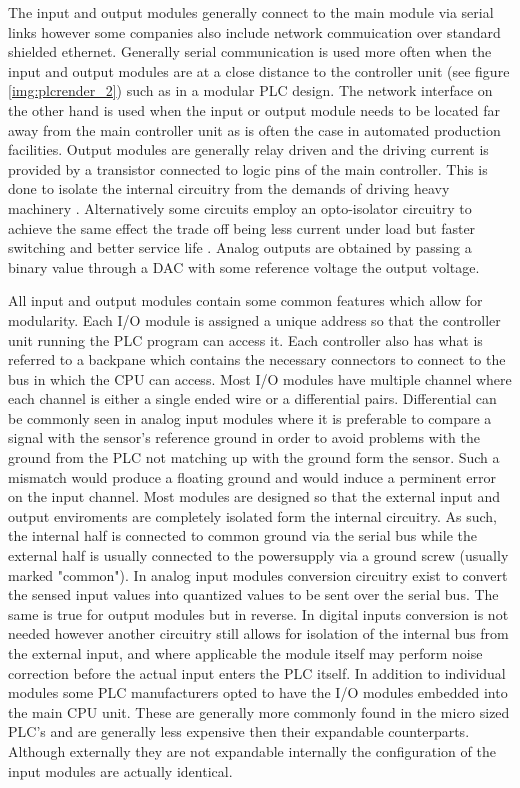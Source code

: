 The input and output modules generally connect to the main module via serial links however some companies also include network commuication over standard shielded ethernet\cite{rockwell_io,rockwell_tech_pub}. Generally serial communication is used more often when the input and output modules are at a close distance to the controller unit (see figure \ref{img:plcrender_2}) such as in a modular PLC design. The network interface on the other hand is used when the input or output module needs to be located far away from the main controller unit\cite{rockwell_tech_pub} as is often the case in automated production facilities. Output modules are generally relay driven and the driving current is provided by a transistor connected to logic pins of the main controller. This is done to isolate the internal circuitry from the demands of driving heavy machinery \cite{plcapp}. Alternatively some circuits employ an opto-isolator circuitry to achieve the same effect the trade off being less current under load but faster switching and better service life \cite{plcapp}. Analog outputs are obtained by passing a binary value through a DAC with some reference voltage the output voltage.

All input and output modules contain some common  features which allow for modularity. Each I/O module is assigned a unique address so that the controller unit running the PLC program can access it. Each controller also has what is referred to a backpane which contains the necessary connectors to connect to the bus in which the CPU can access. Most I/O modules have multiple channel where each channel is either a single ended wire or a differential pairs. Differential can be commonly seen in analog input modules where it is preferable to compare a signal with the sensor's reference ground in order to avoid problems with the ground from the PLC not matching up with the ground form the sensor. Such a mismatch would produce a floating ground and would induce a perminent error on the input channel. Most modules are designed so that the external input and output enviroments are completely isolated form the internal circuitry. As such, the internal half is connected to common ground via the serial bus while the external half is usually connected to the powersupply via a ground screw (usually marked "common"). In analog input modules conversion circuitry exist to convert the sensed input values into quantized values to be sent over the serial bus. The same is true for output modules but in reverse. In digital inputs conversion is not needed however another circuitry still allows for isolation of the internal bus from the external input, and where applicable the module itself may perform noise correction before the actual input enters the PLC itself. In addition to individual modules some PLC manufacturers opted to have the I/O modules embedded into the main CPU unit. These are generally more commonly found in the micro sized PLC's and are generally less expensive then their expandable counterparts. Although externally they are not expandable internally the configuration of the input modules are actually identical.

